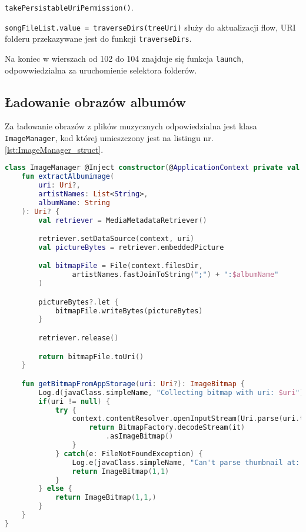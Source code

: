 \texttt{takePersistableUriPermission()}.

\texttt{songFileList.value = traverseDirs(treeUri)} służy do aktualizacji flow, URI folderu przekazywane jest do funkcji \texttt{traverseDirs}.

Na koniec w wierszach od 102 do 104 znajduje się funkcja \texttt{launch}, odpowwiedzialna za uruchomienie selektora folderów.

\subsection{Ładowanie obrazów albumów}

Za ładowanie obrazów z plików muzycznych odpowiedzialna jest klasa \texttt{ImageManager}, kod której umieszczony jest na listingu nr. \ref{lst:ImageManager_struct}.

\begin{lstlisting}[caption=Strukutura klasy \texttt{ImageManager}, label={lst:ImageManager_struct}, language=kotlin]
class ImageManager @Inject constructor(@ApplicationContext private val context: Context) {
    fun extractAlbumimage(
        uri: Uri?,
        artistNames: List<String>,
        albumName: String
    ): Uri? {
        val retriever = MediaMetadataRetriever()

        retriever.setDataSource(context, uri)
        val pictureBytes = retriever.embeddedPicture

        val bitmapFile = File(context.filesDir,
                artistNames.fastJoinToString(";") + ":$albumName"
        )

        pictureBytes?.let {
            bitmapFile.writeBytes(pictureBytes)
        }

        retriever.release()

        return bitmapFile.toUri()
    }

    fun getBitmapFromAppStorage(uri: Uri?): ImageBitmap {
        Log.d(javaClass.simpleName, "Collecting bitmap with uri: $uri")
        if(uri != null) {
            try {
                context.contentResolver.openInputStream(Uri.parse(uri.toString())).use {
                    return BitmapFactory.decodeStream(it)
                        .asImageBitmap()
                }
            } catch(e: FileNotFoundException) {
                Log.e(javaClass.simpleName, "Can't parse thumbnail at: $uri")
                return ImageBitmap(1,1)
            }
        } else {
            return ImageBitmap(1,1,)
        }
    }
}
\end{lstlisting}

